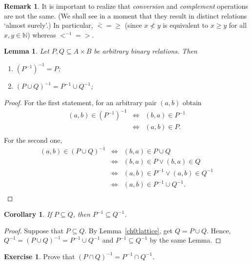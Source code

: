 \documentclass[12pt,notitlepage]{article}
\theoremstyle{plain}
\newtheorem{lemma}[thm]{Lemma}
\newtheorem{corr}[thm]{Corollary}
\theoremstyle{definition}
\newtheorem{exc}[thm]{Exercise}
\newtheorem{rem}[thm]{Remark}
\theoremstyle{plain}
\newcommand{\N}{\mathbb{N}}
\newcommand{\sbs}{\subseteq}
\newcommand{\1}{\mathbf{1}}
\newcommand{\0}{\mathbf{0}}
\newcommand{\mcomm}[1]{}
\begin{document}
\begin{rem}
It is important to realize that \emph{conversion} and \emph{complement} operations are not the same. (We shall see in a moment that they result in distinct relations `almost surely'.) In particular, ${\bar <} = {\geq}$ (since $x \not< y$ is equivalent to $x \geq y$ for all $x, y \in \N$) whereas ${<}^{-1} = {>}$.
\end{rem}
\mcomm{In my experience, the students often confuse the two.}

\begin{lemma} Let $P, Q \sbs A \times B$ be arbitrary binary relations. Then
\begin{enumerate}
\item $(P^{-1})^{-1} = P$;
\item $(P \cup Q)^{-1} = P^{-1} \cup Q^{-1}$;
\end{enumerate}
\end{lemma}
\begin{proof}
For the first statement, for an arbitrary pair $(a,b)$ obtain
$$
\begin{array}{rcl}
(a, b) \in (P^{-1})^{-1} &\iff& (b,a) \in P^{-1}\\
&\iff&  (a,b) \in P.\\
\end{array}
$$
For the second one, 
$$
\begin{array}{rcl}
(a, b) \in (P \cup Q)^{-1} &\iff& (b,a) \in P \cup Q\\
&\iff& (b,a) \in P \vee (b,a) \in Q\\
&\iff& (a,b) \in P^{-1} \vee (a,b) \in Q^{-1}\\
&\iff& (a,b) \in P^{-1} \cup Q^{-1}.\\
\end{array}
$$
\end{proof}
\begin{corr}
If $P \sbs Q$, then $P^{-1} \sbs Q^{-1}$.
\end{corr}
\begin{proof}
Suppose that $P \sbs Q$. By Lemma~\ref{ch0:lattice}, get $Q = P \cup Q$. Hence,
$Q^{-1} = (P \cup Q)^{-1} = P^{-1} \cup Q^{-1}$
and $P^{-1} \sbs Q^{-1}$ by the same Lemma.
\end{proof}

\begin{exc}
Prove that $(P \cap Q)^{-1} = P^{-1} \cap Q^{-1}$.
\end{exc}
\end{document}
